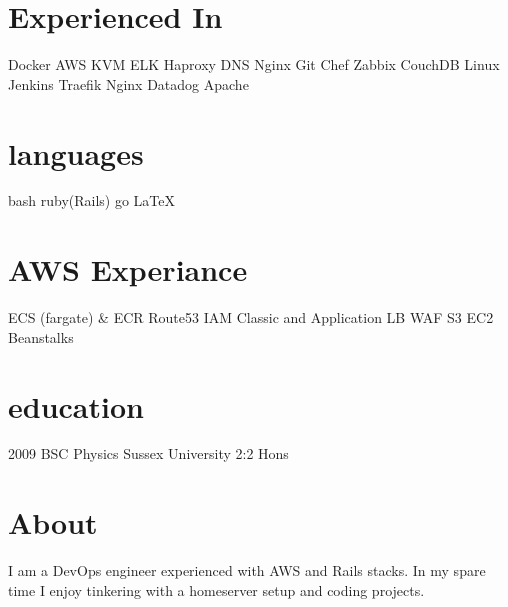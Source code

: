 \documentclass[]{friggeri-cv-a4}
\begin{document}
\fancyfoot{}

\begin{aside}
	\section{Experienced In}
    Docker
    AWS
    KVM
    ELK
    Haproxy
    DNS
    Nginx
    Git
    Chef
    Zabbix
    CouchDB
		Linux
		Jenkins
    Traefik
    Nginx
    Datadog
    Apache
  \section{languages}
    bash
		ruby(Rails)
    go
    \LaTeX
  \section{AWS Experiance}
    ECS (fargate) \& ECR
    Route53
    IAM
    Classic and Application LB
    WAF
    S3
    EC2
    Beanstalks
  \section{education}
    2009 BSC Physics Sussex University 2:2 Hons
\end{aside}

\section{About}
I am a DevOps engineer experienced with AWS and Rails stacks.  
In my spare time I enjoy tinkering with a homeserver setup and coding projects.
\end{document}
